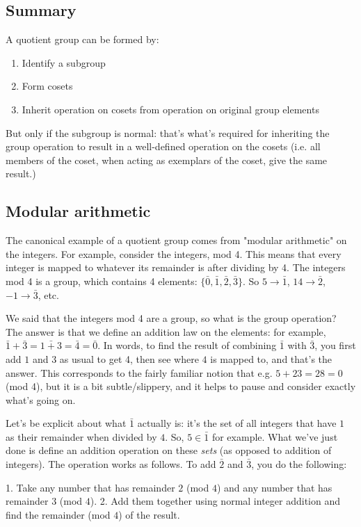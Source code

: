 \subsection{Summary}
A quotient group can be formed by:
\begin{enumerate}
\item Identify a subgroup
\item Form cosets
\item Inherit operation on cosets from operation on original group elements
\end{enumerate}
But only if the subgroup is normal: that's what's required for inheriting the
group operation to result in a well-defined operation on the cosets (i.e. all
members of the coset, when acting as exemplars of the coset, give the same
result.)

\subsection{Modular arithmetic}

The canonical example of a quotient group comes from "modular arithmetic" on
the integers. For example, consider the integers, mod 4. This means that every
integer is mapped to whatever its remainder is after dividing by 4. The
integers mod 4 is a group, which contains 4 elements: $\{\bar 0, \bar 1, \bar
2, \bar 3\}$. So $5 \rightarrow \bar 1$, $14 \rightarrow \bar 2$, $-1
\rightarrow \bar 3$, etc.

We said that the integers mod 4 are a group, so what is the group operation?
The answer is that we define an addition law on the elements: for example,
$\bar 1 + \bar 3 = \bar{1 + 3} = \bar 4 = \bar 0$. In words, to find the result
of combining $\bar 1$ with $\bar 3$, you first add $1$ and $3$ as usual to get
4, then see where $4$ is mapped to, and that's the answer. This corresponds to
the fairly familiar notion that e.g. $5 + 23 = 28 = 0$ (mod 4), but it is a bit
subtle/slippery, and it helps to pause and consider exactly what's going on.

Let's be explicit about what $\bar 1$ actually is: it's the set of all integers
that have $1$ as their remainder when divided by $4$. So, $5 \in \bar 1$ for
example. What we've just done is define an addition operation on these
\emph{sets} (as opposed to addition of integers). The operation works as
follows. To add $\bar 2$ and $\bar 3$, you do the following:

1. Take any number that has remainder $2$ (mod $4$) and any number that has
   remainder $3$ (mod $4$).
2. Add them together using normal integer addition and find the remainder (mod
   $4$) of the result.

